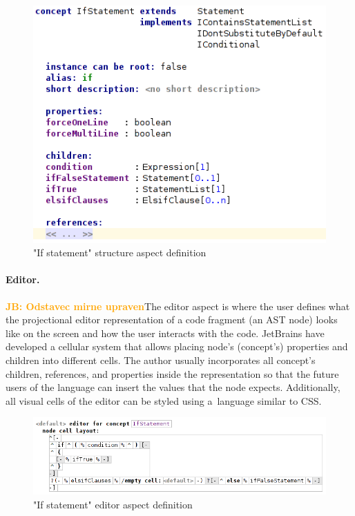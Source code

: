\documentclass[10pt]{sigplanconf}
\newcommand{\JB}[1]{\textcolor{orange}{\bfseries JB: #1}} %
\begin{document}
\begin{figure}[ht]
	\centering
	\includegraphics[scale=0.55]{./images/if_statement_structure.png}
	\caption{"If statement" structure aspect definition}
	\label{fig:if_statement_structure}
\end{figure}

\paragraph{Editor.}
\JB{Odstavec mirne upraven}The editor aspect is where the user defines what the projectional editor representation of a code fragment (an AST node) looks like on the screen and how the user interacts with the code. JetBrains have developed a cellular system that allows placing node's (concept's) properties and children into different cells. The author usually incorporates all concept's children, references, and properties inside the representation so that the future users of the language can insert the values that the node expects. Additionally, all visual cells of the editor can be styled using a~language similar to CSS.

\begin{figure}[ht]
	\centering
	\includegraphics[scale=0.5]{./images/if_statement_editor_definition.png}
	\caption{"If statement" editor aspect definition}
	\label{fig:if_editor_definition}
\end{figure}
\end{document}
